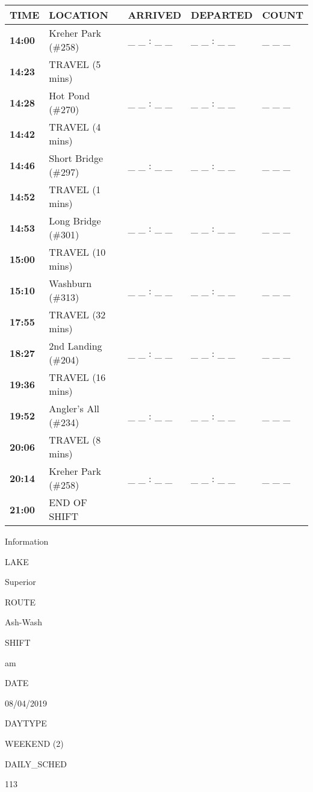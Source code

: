 \documentclass[]{article}
\begin{document}
\begin{tabular}{>{\bfseries}lllll}
\toprule
\textbf{TIME} & \textbf{LOCATION} & \textbf{ARRIVED} & \textbf{DEPARTED} & \textbf{COUNT}\\
\midrule
14:00 & Kreher Park (\#258) & \_ \_ : \_ \_ & \_ \_ : \_ \_ & \_ \_ \_\\
14:23 & TRAVEL (5 mins) &  &  & \\
14:28 & Hot Pond (\#270) & \_ \_ : \_ \_ & \_ \_ : \_ \_ & \_ \_ \_\\
14:42 & TRAVEL (4 mins) &  &  & \\
14:46 & Short Bridge (\#297) & \_ \_ : \_ \_ & \_ \_ : \_ \_ & \_ \_ \_\\
14:52 & TRAVEL (1 mins) &  &  & \\
14:53 & Long Bridge (\#301) & \_ \_ : \_ \_ & \_ \_ : \_ \_ & \_ \_ \_\\
15:00 & TRAVEL (10 mins) &  &  & \\
15:10 & Washburn (\#313) & \_ \_ : \_ \_ & \_ \_ : \_ \_ & \_ \_ \_\\
17:55 & TRAVEL (32 mins) &  &  & \\
18:27 & 2nd Landing (\#204) & \_ \_ : \_ \_ & \_ \_ : \_ \_ & \_ \_ \_\\
19:36 & TRAVEL (16 mins) &  &  & \\
19:52 & Angler's All (\#234) & \_ \_ : \_ \_ & \_ \_ : \_ \_ & \_ \_ \_\\
20:06 & TRAVEL (8 mins) &  &  & \\
20:14 & Kreher Park (\#258) & \_ \_ : \_ \_ & \_ \_ : \_ \_ & \_ \_ \_\\
21:00 & END OF SHIFT &  &  & \\
\bottomrule
\end{tabular}\newpage

Information

LAKE

Superior

ROUTE

Ash-Wash

SHIFT

am

DATE

08/04/2019

DAYTYPE

WEEKEND (2)

DAILY\_SCHED

113

\vspace{24pt}
\end{document}
